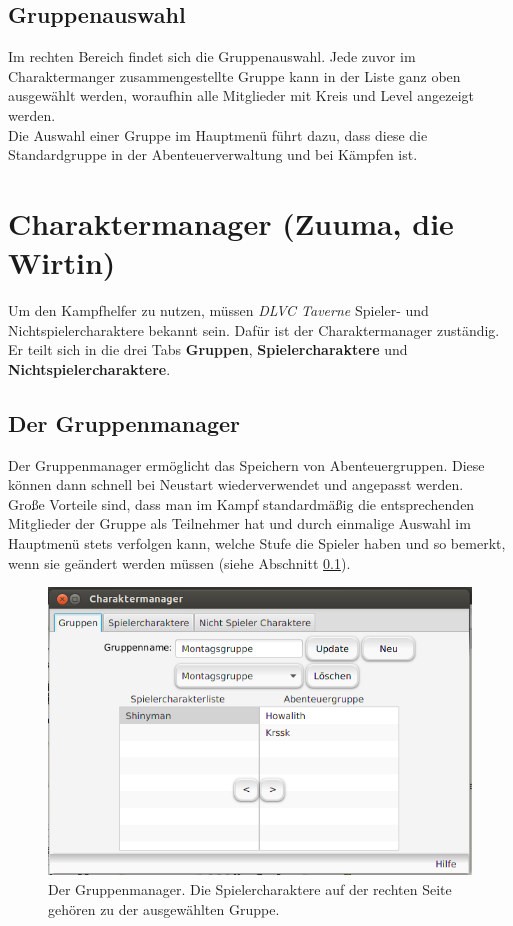 \documentclass[11pt, a4paper, german]{article}
\begin{document}
\subsection{Gruppenauswahl}\label{subsection:gruppenauswahl}
Im rechten Bereich findet sich die Gruppenauswahl. Jede zuvor im Charaktermanger zusammengestellte Gruppe kann in der Liste ganz oben ausgewählt werden, woraufhin alle Mitglieder mit Kreis und Level angezeigt werden.\\
Die Auswahl einer Gruppe im Hauptmenü führt dazu, dass diese die Standardgruppe in der Abenteuerverwaltung und bei Kämpfen ist.

\newpage

\section{Charaktermanager (Zuuma, die Wirtin)}
Um den Kampfhelfer zu nutzen, müssen \textit{DLVC Taverne} Spieler- und Nichtspielercharaktere bekannt sein. Dafür ist der Charaktermanager zuständig. Er teilt sich in die drei Tabs \textbf{Gruppen}, \textbf{Spielercharaktere} und \textbf{Nichtspielercharaktere}.

\subsection{Der Gruppenmanager}
Der Gruppenmanager ermöglicht das Speichern von Abenteuergruppen. Diese können dann schnell bei Neustart wiederverwendet und angepasst werden.\\
Große Vorteile sind, dass man im Kampf standardmäßig die entsprechenden Mitglieder der Gruppe als Teilnehmer hat und durch einmalige Auswahl im Hauptmenü stets verfolgen kann, welche Stufe die Spieler haben und so bemerkt, wenn sie geändert werden müssen (siehe Abschnitt \ref{subsection:gruppenauswahl}).\\
\begin{figure}
\centering
\includegraphics[width=1\linewidth]{Bilder/Gruppenmanager}
\caption{Der Gruppenmanager. Die Spielercharaktere auf der rechten Seite gehören zu der ausgewählten Gruppe.}
\label{fig:Gruppenmanager}
\end{figure}
\end{document}
